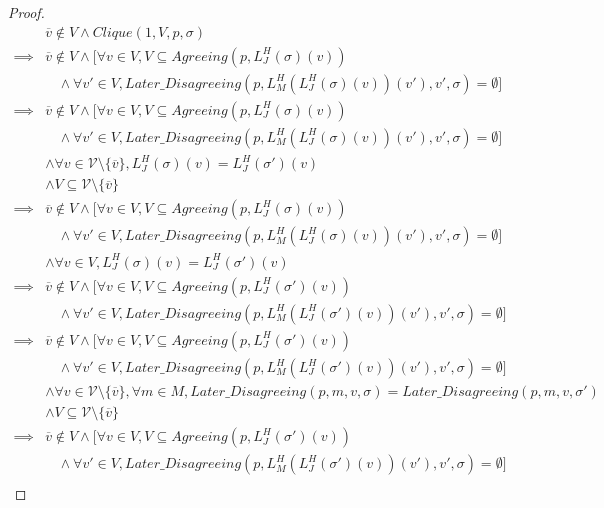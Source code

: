 \begin{proof}
  \begin{align}
    &\overline{v} \notin V \land Clique(1, V, p, \sigma) \\
    \implies& \overline{v} \notin V \land [\forall v \in V, V \subseteq Agreeing(p, L^H_J(\sigma)(v)) \\
            &~~~~\land \forall v' \in V, Later\_Disagreeing(p, L^H_M(L^H_J(\sigma)(v))(v'), v', \sigma) = \emptyset] \\
    \implies& \overline{v} \notin V \land [\forall v \in V, V \subseteq Agreeing(p, L^H_J(\sigma)(v)) \\
            &~~~~\land \forall v' \in V, Later\_Disagreeing(p, L^H_M(L^H_J(\sigma)(v))(v'), v', \sigma) = \emptyset] \\
            &\land \forall v \in \mathcal{V} \setminus \{\overline{v}\}, L^H_J(\sigma)(v) = L^H_J(\sigma')(v) \\
            &\land V \subseteq \mathcal{V} \setminus \{\overline{v}\} \\
    \implies& \overline{v} \notin V \land [\forall v \in V, V \subseteq Agreeing(p, L^H_J(\sigma)(v)) \\
            &~~~~\land \forall v' \in V, Later\_Disagreeing(p, L^H_M(L^H_J(\sigma)(v))(v'), v', \sigma) = \emptyset] \\
            &\land \forall v \in V, L^H_J(\sigma)(v) = L^H_J(\sigma')(v) \\
    \implies& \overline{v} \notin V \land [\forall v \in V, V \subseteq Agreeing(p, L^H_J(\sigma')(v)) \\
            &~~~~\land \forall v' \in V, Later\_Disagreeing(p, L^H_M(L^H_J(\sigma')(v))(v'), v', \sigma) = \emptyset] \\
    \implies& \overline{v} \notin V \land [\forall v \in V, V \subseteq Agreeing(p, L^H_J(\sigma')(v)) \\
            &~~~~\land \forall v' \in V, Later\_Disagreeing(p, L^H_M(L^H_J(\sigma')(v))(v'), v', \sigma) = \emptyset] \\
            &\land \forall v \in \mathcal{V} \setminus \{\overline{v}\}, \forall m \in M, Later\_Disagreeing(p, m, v, \sigma) = Later\_Disagreeing(p, m, v, \sigma') \\
            &\land V \subseteq \mathcal{V} \setminus \{\overline{v}\} \\
    \implies& \overline{v} \notin V \land [\forall v \in V, V \subseteq Agreeing(p, L^H_J(\sigma')(v)) \\
            &~~~~\land \forall v' \in V, Later\_Disagreeing(p, L^H_M(L^H_J(\sigma')(v))(v'), v', \sigma) = \emptyset] \\

\end{align}
\end{proof}
